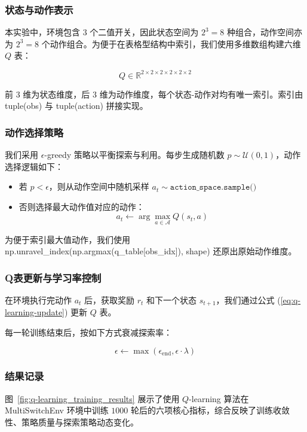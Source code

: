 \subsubsection{状态与动作表示}

本实验中，环境包含 \(3\) 个二值开关，因此状态空间为 \(2^3 = 8\) 种组合，动作空间亦为 \(2^3 = 8\) 个动作组合。为便于在表格型结构中索引，我们使用多维数组构建六维 \(Q\) 表：

\[
Q \in \mathbb{R}^{2 \times 2 \times 2 \times 2 \times 2 \times 2}
\]

前 \(3\) 维为状态维度，后 \(3\) 维为动作维度，每个状态-动作对均有唯一索引。索引由 \textsf{tuple(obs)} 与 \textsf{tuple(action)} 拼接实现。

\subsubsection{动作选择策略}

我们采用 \(\epsilon\)-greedy 策略以平衡探索与利用。每步生成随机数 \(p \sim \mathcal{U}(0,1)\)，动作选择逻辑如下：

\begin{itemize}
    \item 若 \(p < \epsilon\)，则从动作空间中随机采样 \(a_t \sim \texttt{action\_space.sample()}\)
    \item 否则选择最大动作值对应的动作：
    \[
    a_t \leftarrow \arg\max_{a \in \mathcal{A}} Q(s_t, a)
    \]
\end{itemize}

为便于索引最大值动作，我们使用 \textsf{np.unravel\_index(np.argmax(q\_table[obs\_idx]), shape)} 还原出原始动作维度。

\subsubsection{Q表更新与学习率控制}

在环境执行完动作 \(a_t\) 后，获取奖励 \(r_t\) 和下一个状态 \(s_{t+1}\)，我们通过公式 (\ref{eq:q-learning-update}) 更新 \(Q\) 表。

每一轮训练结束后，按如下方式衰减探索率：

\[
\epsilon \leftarrow \max(\epsilon_{\text{end}}, \epsilon \cdot \lambda)
\]

\subsubsection{结果记录}

图~\ref{fig:q-learning_training_results} 展示了使用 \(Q\)-learning 算法在 MultiSwitchEnv 环境中训练 \(1000\) 轮后的六项核心指标，综合反映了训练收敛性、策略质量与探索策略动态变化。

